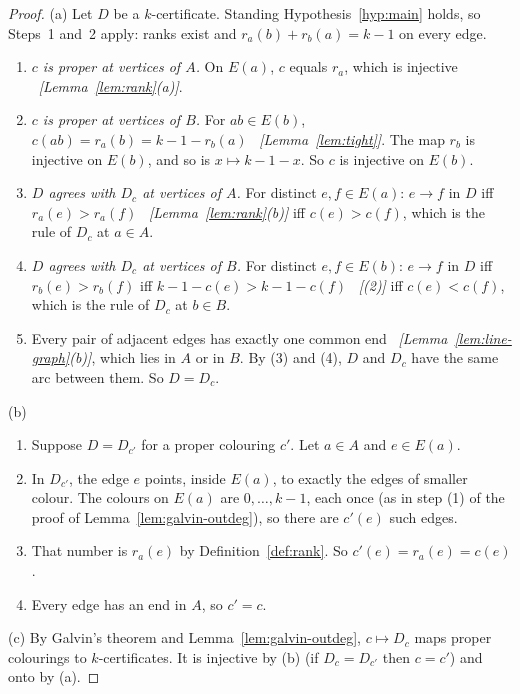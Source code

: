 \documentclass[11pt]{article}
\theoremstyle{plain}
\theoremstyle{definition}
\theoremstyle{remark}
\newcommand{\st}[1]{E(#1)}
\newcommand{\why}[1]{\unskip\ \textit{[#1]}}
\newenvironment{steps}{\begin{enumerate}[label=(\arabic*),leftmargin=2.2em,itemsep=0.35em]}{\end{enumerate}}
\begin{document}
\begin{proof}
(a) Let $D$ be a $k$-certificate. Standing Hypothesis~\ref{hyp:main} holds, so Steps~1 and~2
apply: ranks exist and $r_a(b)+r_b(a)=k-1$ on every edge.
\begin{steps}
  \item \emph{$c$ is proper at vertices of $A$.} On $\st{a}$, $c$ equals $r_a$, which is
    injective \why{Lemma~\ref{lem:rank}(a)}.
  \item \emph{$c$ is proper at vertices of $B$.} For $ab\in\st{b}$,
    $c(ab)=r_a(b)=k-1-r_b(a)$ \why{Lemma~\ref{lem:tight}}. The map $r_b$ is injective on
    $\st{b}$, and so is $x\mapsto k-1-x$. So $c$ is injective on $\st{b}$.
  \item \emph{$D$ agrees with $D_c$ at vertices of $A$.} For distinct $e,f\in\st{a}$: $e\to f$
    in $D$ iff $r_a(e)>r_a(f)$ \why{Lemma~\ref{lem:rank}(b)} iff $c(e)>c(f)$, which is the rule of
    $D_c$ at $a\in A$.
  \item \emph{$D$ agrees with $D_c$ at vertices of $B$.} For distinct $e,f\in\st{b}$: $e\to f$
    in $D$ iff $r_b(e)>r_b(f)$ iff $k-1-c(e)>k-1-c(f)$ \why{(2)} iff $c(e)<c(f)$, which is the
    rule of $D_c$ at $b\in B$.
  \item Every pair of adjacent edges has exactly one common end
    \why{Lemma~\ref{lem:line-graph}(b)}, which lies in $A$ or in $B$. By (3) and (4), $D$ and
    $D_c$ have the same arc between them. So $D=D_c$.
\end{steps}

(b) \begin{steps}
  \item Suppose $D=D_{c'}$ for a proper colouring $c'$. Let $a\in A$ and $e\in\st{a}$.
  \item In $D_{c'}$, the edge $e$ points, inside $\st{a}$, to exactly the edges of smaller
    colour. The colours on $\st{a}$ are $0,\dots,k-1$, each once (as in
    step (1) of the proof of Lemma~\ref{lem:galvin-outdeg}), so there are $c'(e)$ such edges.
  \item That number is $r_a(e)$ by Definition~\ref{def:rank}. So $c'(e)=r_a(e)=c(e)$.
  \item Every edge has an end in $A$, so $c'=c$.
\end{steps}

(c) By Galvin's theorem and Lemma~\ref{lem:galvin-outdeg}, $c\mapsto D_c$ maps proper colourings
to $k$-certificates. It is injective by (b) (if $D_c=D_{c'}$ then $c=c'$) and onto by (a).
\end{proof}
\end{document}
